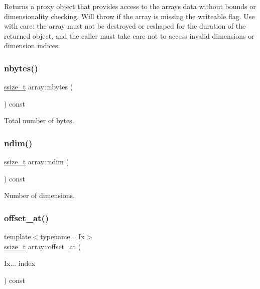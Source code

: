 Returns a proxy object that provides access to the array\textquotesingle{}s data without bounds or dimensionality checking. Will throw if the array is missing the {\ttfamily writeable} flag. Use with care\+: the array must not be destroyed or reshaped for the duration of the returned object, and the caller must take care not to access invalid dimensions or dimension indices. \mbox{\label{classarray_a0a2a16579bf2918347a8762c03f10137}} 
\subsubsection{\texorpdfstring{nbytes()}{nbytes()}}
{\footnotesize\ttfamily \mbox{\hyperlink{detail_2common_8h_ac430d16fc097b3bf0a7469cfd09decda}{ssize\+\_\+t}} array\+::nbytes (\begin{DoxyParamCaption}{ }\end{DoxyParamCaption}) const\hspace{0.3cm}{\ttfamily [inline]}}



Total number of bytes. 

\mbox{\label{classarray_a184360492eac7224753f132d1a0a973e}} 
\subsubsection{\texorpdfstring{ndim()}{ndim()}}
{\footnotesize\ttfamily \mbox{\hyperlink{detail_2common_8h_ac430d16fc097b3bf0a7469cfd09decda}{ssize\+\_\+t}} array\+::ndim (\begin{DoxyParamCaption}{ }\end{DoxyParamCaption}) const\hspace{0.3cm}{\ttfamily [inline]}}



Number of dimensions. 

\mbox{\label{classarray_a0063e6a1d118abb371f769377b5fee21}} 
\subsubsection{\texorpdfstring{offset\_at()}{offset\_at()}\hspace{0.1cm}{\footnotesize\ttfamily [1/2]}}
{\footnotesize\ttfamily template$<$typename... Ix$>$ \\
\mbox{\hyperlink{detail_2common_8h_ac430d16fc097b3bf0a7469cfd09decda}{ssize\+\_\+t}} array\+::offset\+\_\+at (\begin{DoxyParamCaption}\item[{Ix...}]{index }\end{DoxyParamCaption}) const\hspace{0.3cm}{\ttfamily [inline]}}

